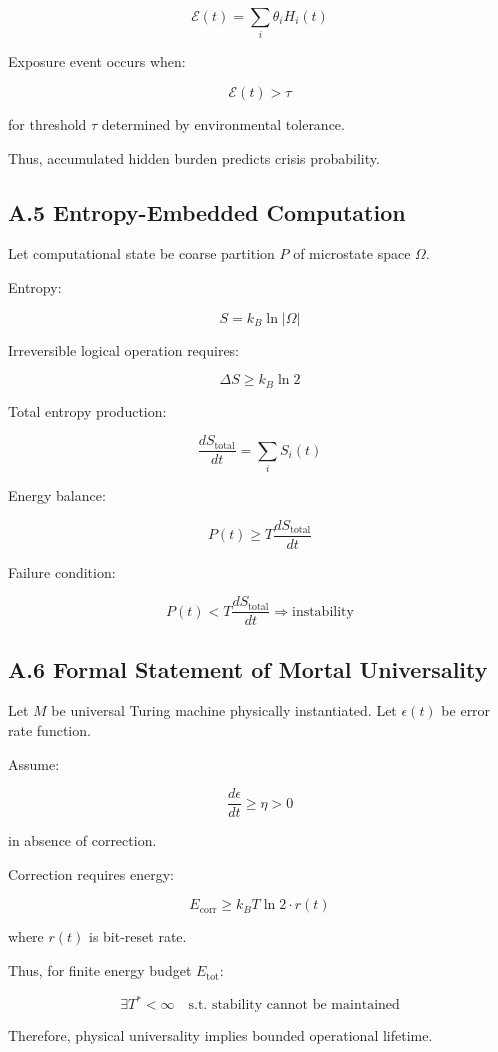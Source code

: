 \documentclass[11pt,openany]{book}
\begin{document}
\[
\mathcal{E}(t) = \sum_i \theta_i H_i(t)
\]

Exposure event occurs when:

\[
\mathcal{E}(t) > \tau
\]

for threshold $\tau$ determined by environmental tolerance.

Thus, accumulated hidden burden predicts crisis probability.

\subsection{A.5 Entropy-Embedded Computation}

Let computational state be coarse partition $P$ of microstate space $\Omega$.

Entropy:

\[
S = k_B \ln |\Omega|
\]

Irreversible logical operation requires:

\[
\Delta S \ge k_B \ln 2
\]

Total entropy production:

\[
\frac{dS_{\text{total}}}{dt}
= \sum_i S_i(t)
\]

Energy balance:

\[
P(t) \ge T \frac{dS_{\text{total}}}{dt}
\]

Failure condition:

\[
P(t) < T \frac{dS_{\text{total}}}{dt}
\Rightarrow \text{instability}
\]

\subsection{A.6 Formal Statement of Mortal Universality}

Let $M$ be universal Turing machine physically instantiated.
Let $\epsilon(t)$ be error rate function.

Assume:

\[
\frac{d\epsilon}{dt} \ge \eta > 0
\]

in absence of correction.

Correction requires energy:

\[
E_{\text{corr}} \ge k_B T \ln 2 \cdot r(t)
\]

where $r(t)$ is bit-reset rate.

Thus, for finite energy budget $E_{\text{tot}}$:

\[
\exists T^* < \infty \quad \text{s.t. stability cannot be maintained}
\]

Therefore, physical universality implies bounded operational lifetime.
\end{document}

